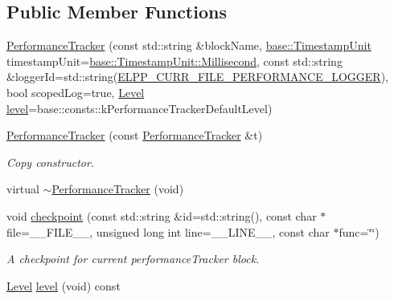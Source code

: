 \subsection*{Public Member Functions}
\begin{DoxyCompactItemize}
\item 
\hyperlink{classel_1_1base_1_1_performance_tracker_a46ac6a851c6d1cde6742a7ebfeedd1b6}{Performance\+Tracker} (const std\+::string \&block\+Name, \hyperlink{namespaceel_1_1base_a1b886858c6409097395b24b1bdf03c39}{base\+::\+Timestamp\+Unit} timestamp\+Unit=\hyperlink{namespaceel_1_1base_a1b886858c6409097395b24b1bdf03c39a988bbeeb80e7e0a6b4651aab5a76b413}{base\+::\+Timestamp\+Unit\+::\+Millisecond}, const std\+::string \&logger\+Id=std\+::string(\hyperlink{easylogging_09_09_8h_a2ed89aa4136d3c3217697afe1e28fa87}{E\+L\+P\+P\+\_\+\+C\+U\+R\+R\+\_\+\+F\+I\+L\+E\+\_\+\+P\+E\+R\+F\+O\+R\+M\+A\+N\+C\+E\+\_\+\+L\+O\+G\+G\+E\+R}), bool scoped\+Log=true, \hyperlink{namespaceel_ab0ac6091262344c52dd2d3ad099e8e36}{Level} \hyperlink{classel_1_1base_1_1_performance_tracker_a3e0ebd666cc7416dc9b818418266161b}{level}=base\+::consts\+::k\+Performance\+Tracker\+Default\+Level)
\item 
\hyperlink{classel_1_1base_1_1_performance_tracker_a49e655c1f414f904b2d6a9abb0d344f4}{Performance\+Tracker} (const \hyperlink{classel_1_1base_1_1_performance_tracker}{Performance\+Tracker} \&t)
\begin{DoxyCompactList}\small\item\em Copy constructor. \end{DoxyCompactList}\item 
virtual \hyperlink{classel_1_1base_1_1_performance_tracker_a19be0aa65c8623273459185277b52b0c}{$\sim$\+Performance\+Tracker} (void)
\item 
void \hyperlink{classel_1_1base_1_1_performance_tracker_aec9a6e149674c5782cc855e49aeb0aaf}{checkpoint} (const std\+::string \&id=std\+::string(), const char $\ast$file=\+\_\+\+\_\+\+F\+I\+L\+E\+\_\+\+\_\+, unsigned long int line=\+\_\+\+\_\+\+L\+I\+N\+E\+\_\+\+\_\+, const char $\ast$func=\char`\"{}\char`\"{})
\begin{DoxyCompactList}\small\item\em A checkpoint for current performance\+Tracker block. \end{DoxyCompactList}\item 
\hyperlink{namespaceel_ab0ac6091262344c52dd2d3ad099e8e36}{Level} \hyperlink{classel_1_1base_1_1_performance_tracker_a3e0ebd666cc7416dc9b818418266161b}{level} (void) const 
\end{DoxyCompactItemize}
